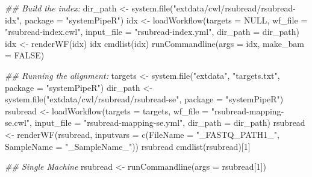\documentclass[14pt,]{article}
\newcommand{\hlnum}[1]{\textcolor[rgb]{0.816,0.125,0.439}{#1}}%
\newcommand{\hlstr}[1]{\textcolor[rgb]{0.251,0.627,0.251}{#1}}%
\newcommand{\hlcom}[1]{\textcolor[rgb]{0.502,0.502,0.502}{\textit{#1}}}%
\newcommand{\hlstd}[1]{\textcolor[rgb]{0.251,0.251,0.251}{#1}}%
\newenvironment{Shaded}{\begin{myshaded}}{\end{myshaded}}
\newcommand{\DecValTok}[1]{\hlnum{#1}}
\newcommand{\ConstantTok}[1]{\hlnum{#1}}
\newcommand{\StringTok}[1]{\hlstr{#1}}
\newcommand{\DocumentationTok}[1]{\hlcom{#1}}
\newcommand{\OtherTok}[1]{{#1}}
\newcommand{\FunctionTok}[1]{\hlstd{#1}}
\newcommand{\AttributeTok}[1]{{#1}}
\newcommand{\NormalTok}[1]{\hlstd{#1}}
\begin{document}
\begin{Shaded}
\begin{Highlighting}[]
\DocumentationTok{\#\# Build the index:}
\NormalTok{dir\_path }\OtherTok{\textless{}{-}} \FunctionTok{system.file}\NormalTok{(}\StringTok{"extdata/cwl/rsubread/rsubread{-}idx"}\NormalTok{, }\AttributeTok{package =} \StringTok{"systemPipeR"}\NormalTok{)}
\NormalTok{idx }\OtherTok{\textless{}{-}} \FunctionTok{loadWorkflow}\NormalTok{(}\AttributeTok{targets =} \ConstantTok{NULL}\NormalTok{, }\AttributeTok{wf\_file =} \StringTok{"rsubread{-}index.cwl"}\NormalTok{, }\AttributeTok{input\_file =} \StringTok{"rsubread{-}index.yml"}\NormalTok{, }
    \AttributeTok{dir\_path =}\NormalTok{ dir\_path)}
\NormalTok{idx }\OtherTok{\textless{}{-}} \FunctionTok{renderWF}\NormalTok{(idx)}
\NormalTok{idx}
\FunctionTok{cmdlist}\NormalTok{(idx)}
\FunctionTok{runCommandline}\NormalTok{(}\AttributeTok{args =}\NormalTok{ idx, }\AttributeTok{make\_bam =} \ConstantTok{FALSE}\NormalTok{)}

\DocumentationTok{\#\# Running the alignment:}
\NormalTok{targets }\OtherTok{\textless{}{-}} \FunctionTok{system.file}\NormalTok{(}\StringTok{"extdata"}\NormalTok{, }\StringTok{"targets.txt"}\NormalTok{, }\AttributeTok{package =} \StringTok{"systemPipeR"}\NormalTok{)}
\NormalTok{dir\_path }\OtherTok{\textless{}{-}} \FunctionTok{system.file}\NormalTok{(}\StringTok{"extdata/cwl/rsubread/rsubread{-}se"}\NormalTok{, }\AttributeTok{package =} \StringTok{"systemPipeR"}\NormalTok{)}
\NormalTok{rsubread }\OtherTok{\textless{}{-}} \FunctionTok{loadWorkflow}\NormalTok{(}\AttributeTok{targets =}\NormalTok{ targets, }\AttributeTok{wf\_file =} \StringTok{"rsubread{-}mapping{-}se.cwl"}\NormalTok{, }
    \AttributeTok{input\_file =} \StringTok{"rsubread{-}mapping{-}se.yml"}\NormalTok{, }\AttributeTok{dir\_path =}\NormalTok{ dir\_path)}
\NormalTok{rsubread }\OtherTok{\textless{}{-}} \FunctionTok{renderWF}\NormalTok{(rsubread, }\AttributeTok{inputvars =} \FunctionTok{c}\NormalTok{(}\AttributeTok{FileName =} \StringTok{"\_FASTQ\_PATH1\_"}\NormalTok{, }\AttributeTok{SampleName =} \StringTok{"\_SampleName\_"}\NormalTok{))}
\NormalTok{rsubread}
\FunctionTok{cmdlist}\NormalTok{(rsubread)[}\DecValTok{1}\NormalTok{]}

\DocumentationTok{\#\# Single Machine}
\NormalTok{rsubread }\OtherTok{\textless{}{-}} \FunctionTok{runCommandline}\NormalTok{(}\AttributeTok{args =}\NormalTok{ rsubread[}\DecValTok{1}\NormalTok{])}
\end{Highlighting}
\end{Shaded}
\end{document}
